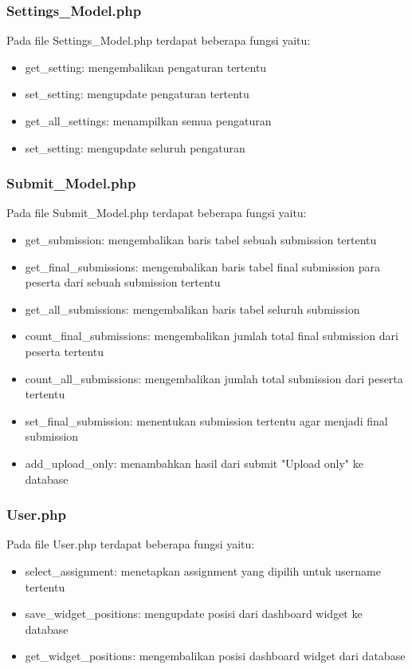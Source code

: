 \subsubsection{Settings\_Model.php}
Pada file Settings\_Model.php terdapat beberapa fungsi yaitu:
\begin{itemize}
	\item get\_setting: mengembalikan pengaturan tertentu
	\item set\_setting: mengupdate pengaturan tertentu
	\item get\_all\_settings: menampilkan semua pengaturan
	\item set\_setting: mengupdate seluruh pengaturan
\end{itemize}

\subsubsection{Submit\_Model.php}
Pada file Submit\_Model.php terdapat beberapa fungsi yaitu:
\begin{itemize}
	\item get\_submission: mengembalikan baris tabel sebuah submission tertentu 
	\item get\_final\_submissions: mengembalikan baris tabel final submission para peserta dari sebuah submission tertentu
	\item get\_all\_submissions: mengembalikan baris tabel seluruh submission
	\item count\_final\_submissions: mengembalikan jumlah total final submission dari peserta tertentu
	\item count\_all\_submissions: mengembalikan jumlah total submission dari peserta tertentu
	\item set\_final\_submission: menentukan submission tertentu agar menjadi final submission
	\item add\_upload\_only: menambahkan hasil dari submit "Upload only" ke database
\end{itemize}

\subsubsection{User.php}
Pada file User.php terdapat beberapa fungsi yaitu:
\begin{itemize}
	\item select\_assignment: menetapkan assignment yang dipilih untuk username tertentu
	\item save\_widget\_positions: mengupdate posisi dari dashboard widget ke database
	\item get\_widget\_positions: mengembalikan posisi dashboard widget dari database
\end{itemize}

